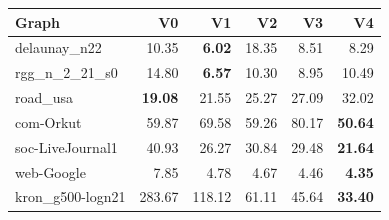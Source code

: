 \begin{tabular}{lrrrrr}
\hline
Graph & V0 & V1 & V2 & V3 & V4 \\
\hline
delaunay\_n22 & 10.35 & \textbf{6.02} & 18.35 & 8.51 & 8.29 \\
rgg\_n\_2\_21\_s0 & 14.80 & \textbf{6.57} & 10.30 & 8.95 & 10.49 \\
road\_usa & \textbf{19.08} & 21.55 & 25.27 & 27.09 & 32.02 \\
com-Orkut & 59.87 & 69.58 & 59.26 & 80.17 & \textbf{50.64} \\
soc-LiveJournal1 & 40.93 & 26.27 & 30.84 & 29.48 & \textbf{21.64} \\
web-Google & 7.85 & 4.78 & 4.67 & 4.46 & \textbf{4.35} \\
kron\_g500-logn21 & 283.67 & 118.12 & 61.11 & 45.64 & \textbf{33.40} \\
\hline
\end{tabular}

